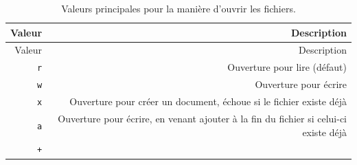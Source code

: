 \documentclass[12pt,]{book}
\numberwithin{equation}{section}
\numberwithin{countremarque}{section}
\begin{document}
\begin{longtable}[]{@{}rr@{}}
\caption{Valeurs principales pour la manière d'ouvrir les
fichiers.}\tabularnewline
\toprule
\begin{minipage}[b]{0.12\columnwidth}\raggedleft\strut
Valeur\strut
\end{minipage} & \begin{minipage}[b]{0.61\columnwidth}\raggedleft\strut
Description\strut
\end{minipage}\tabularnewline
\midrule
\endfirsthead
\toprule
\begin{minipage}[b]{0.12\columnwidth}\raggedleft\strut
Valeur\strut
\end{minipage} & \begin{minipage}[b]{0.61\columnwidth}\raggedleft\strut
Description\strut
\end{minipage}\tabularnewline
\midrule
\endhead
\begin{minipage}[t]{0.12\columnwidth}\raggedleft\strut
\texttt{r}\strut
\end{minipage} & \begin{minipage}[t]{0.61\columnwidth}\raggedleft\strut
Ouverture pour lire (défaut)\strut
\end{minipage}\tabularnewline
\begin{minipage}[t]{0.12\columnwidth}\raggedleft\strut
\texttt{w}\strut
\end{minipage} & \begin{minipage}[t]{0.61\columnwidth}\raggedleft\strut
Ouverture pour écrire\strut
\end{minipage}\tabularnewline
\begin{minipage}[t]{0.12\columnwidth}\raggedleft\strut
\texttt{x}\strut
\end{minipage} & \begin{minipage}[t]{0.61\columnwidth}\raggedleft\strut
Ouverture pour créer un document, échoue si le fichier existe déjà\strut
\end{minipage}\tabularnewline
\begin{minipage}[t]{0.12\columnwidth}\raggedleft\strut
\texttt{a}\strut
\end{minipage} & \begin{minipage}[t]{0.61\columnwidth}\raggedleft\strut
Ouverture pour écrire, en venant ajouter à la fin du fichier si celui-ci
existe déjà\strut
\end{minipage}\tabularnewline
\begin{minipage}[t]{0.12\columnwidth}\raggedleft\strut
\texttt{+}\strut
\end{minipage} & \begin{minipage}[t]{0.61\columnwidth}\raggedleft\strut

\end{minipage}
\end{longtable}
\end{document}
